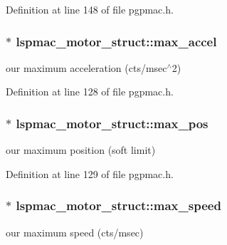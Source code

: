 Definition at line 148 of file pgpmac.\-h.

\hypertarget{structlspmac__motor__struct_a50cf4c0711cea164e332bc34705a1a68}{
\subsubsection[{max\-\_\-accel}]{$\ast$ lspmac\-\_\-motor\-\_\-struct\-::max\-\_\-accel}}\label{structlspmac__motor__struct_a50cf4c0711cea164e332bc34705a1a68}


our maximum acceleration (cts/msec$^\wedge$2) 



Definition at line 128 of file pgpmac.\-h.

\hypertarget{structlspmac__motor__struct_aac8c31a857910cdcbb409331e128e766}{
\subsubsection[{max\-\_\-pos}]{$\ast$ lspmac\-\_\-motor\-\_\-struct\-::max\-\_\-pos}}\label{structlspmac__motor__struct_aac8c31a857910cdcbb409331e128e766}


our maximum position (soft limit) 



Definition at line 129 of file pgpmac.\-h.

\hypertarget{structlspmac__motor__struct_a69e49769a1001665377efc7193d88a0a}{
\subsubsection[{max\-\_\-speed}]{$\ast$ lspmac\-\_\-motor\-\_\-struct\-::max\-\_\-speed}}\label{structlspmac__motor__struct_a69e49769a1001665377efc7193d88a0a}


our maximum speed (cts/msec) 



